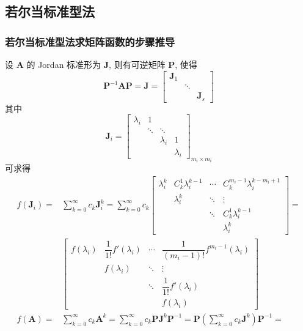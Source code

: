 \subsection{若尔当标准型法}

\subsubsection{若尔当标准型法求矩阵函数的步骤推导}

设 $\bm{A}$ 的 Jordan 标准形为 $\bm{J}$, 则有可逆矩阵 $\bm{P}$, 使得
$$
    \bm{P}^{-1}\bm{AP} = \bm{J} = \begin{bmatrix}
        \bm{J}_1 &        &          \\
                 & \ddots &          \\
                 &        & \bm{J}_s
    \end{bmatrix}
$$
其中
$$
    \bm{J}_i = \begin{bmatrix}
        \lambda_i & 1      &           &           \\
                  & \ddots & \ddots    &           \\
                  &        & \lambda_i & 1         \\
                  &        &           & \lambda_i
    \end{bmatrix}_{m_i \times m_i}
$$
可求得
\begin{align*}
    f(\bm{J}_i) = & \sum\limits_{k = 0}^\infty c_k \bm{J}_i^k = \sum\limits_{k = 0}^\infty c_k
    \begin{bmatrix}
        \lambda_i^k & C_k^1 \lambda_i^{k-1} & \cdots & C_k^{m_i - 1}\lambda_i^{k-m_i+1} \\
                    & \lambda_i^k           & \ddots & \vdots                           \\
                    &                       & \ddots & C_k^1\lambda_i^{k-1}             \\
                    &                       &        & \lambda_i^k
    \end{bmatrix}   =                                                                   \\
                  & \begin{bmatrix}
                        f(\lambda_i) & \dfrac{1}{1!}f'(\lambda_i) & \cdots & \dfrac{1}{(m_i - 1)!}f^{m_i - 1}(\lambda_i) \\
                                     & f(\lambda_i)               & \ddots & \vdots                                      \\
                                     &                            & \ddots & \dfrac{1}{1!} f'(\lambda_i)                 \\
                                     &                            &        & f(\lambda_i)
                    \end{bmatrix}                                  \\
    f(\bm{A}) =   & \sum_{k=0}^\infty c_k\bm{A}^k = \sum_{k=0}^\infty c_k \bm{PJ}^k\bm{P}^{-1} = \bm{P}(\sum_{k=0}^\infty c_k \bm{J}^k) \bm{P}^{-1} =
\end{align*}

